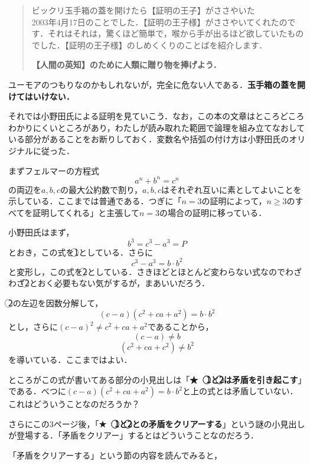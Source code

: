 \begin{quotation}
ビックリ玉手箱の蓋を開けたら【証明の王子】がささやいた\\

2003年4月17日のことでした．【証明の王子様】がささやいてくれたのです．それはそれは，驚くほど簡単で，喉から手が出るほど欲していたものでした．【証明の王子様】のしめくくりのことばを紹介します．
\begin{center}
\textbf{【人間の英知】のために人類に贈り物を捧げよう．}
\end{center}
\end{quotation}

ユーモアのつもりなのかもしれないが，完全に危ない人である．\textbf{玉手箱の蓋を開けてはいけない．}

それでは小野田氏による証明を見ていこう．なお，この本の文章はところどころわかりにくいところがあり，わたしが読み取れた範囲で論理を組み立てなおしている部分があることをお断りしておく．変数名や括弧の付け方は小野田氏のオリジナルに従った．

まずフェルマーの方程式
\[a^n+b^n=c^n\]
の両辺を$a,b,c$の最大公約数で割り，$a,b,c$はそれぞれ互いに素としてよいことを示している．ここまでは普通である．つぎに「$n=3$の証明によって，$n\geq 3$のすべてを証明してくれる」と主張して$n=3$の場合の証明に移っている．



小野田氏はまず，
\[b^3=c^3-a^3=P\]
とおき，この式を\textcircled{\scriptsize 1}としている．さらに
\[c^3-a^3=b\cdot b^2\]
と変形し，この式を\textcircled{\scriptsize 2}としている．さきほどとほとんど変わらない式なのでわざわざ\textcircled{\scriptsize 2}とおく必要もない気がするが，まあいいだろう．

\textcircled{\scriptsize 2}の左辺を因数分解して，
\[(c-a)(c^2+ca+a^2)=b\cdot b^2\]
とし，さらに$(c-a)^2 \neq c^2+ca+a^2$であることから，
\[(c-a)\neq b\]
\[(c^2+ca+c^2)\neq b^2\]
を導いている．ここまではよい．

ところがこの式が書いてある部分の小見出しは「\textbf{★　\textcircled{\scriptsize 1}と\textcircled{\scriptsize 2}は矛盾を引き起こす}」である．べつに$(c-a)(c^2+ca+a^2)=b\cdot b^2$と上の式とは矛盾していない．これはどういうことなのだろうか？

さらにこの3ページ後，「\textbf{★　\textcircled{\scriptsize 1}と\textcircled{\scriptsize 2}との矛盾をクリアーする}」という謎の小見出しが登場する．「矛盾をクリアー」するとはどういうことなのだろう．

「矛盾をクリアーする」という節の内容を読んでみると，

